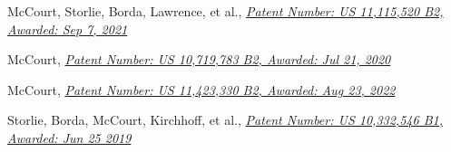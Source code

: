 \begin{patnumerate}
\item \begin{minipage}[t]{\textwidth} McCourt, Storlie, Borda, Lawrence, et al., \href{https://patents.google.com/patent/US11115520B2}{\textit{Patent Number: US 11,115,520 B2, Awarded: Sep 7, 2021}}\\
  \end{minipage}

\item \begin{minipage}[t]{\textwidth} McCourt, \href{https://patents.google.com/patent/US10719783B2}{\textit{Patent Number: US 10,719,783 B2, Awarded: Jul 21, 2020}}\\
  \end{minipage}

\item \begin{minipage}[t]{\textwidth} McCourt, \href{https://patents.google.com/patent/US11423330B2}{\textit{Patent Number: US 11,423,330 B2, Awarded: Aug 23, 2022}}\\
  \end{minipage}

\item \begin{minipage}[t]{\textwidth} Storlie, Borda, McCourt, Kirchhoff, et al., \href{https://patents.google.com/patent/US10332546B1}{\textit{Patent Number: US 10,332,546 B1, Awarded: Jun 25 2019}}\\
  \end{minipage}

\end{patnumerate}
%
